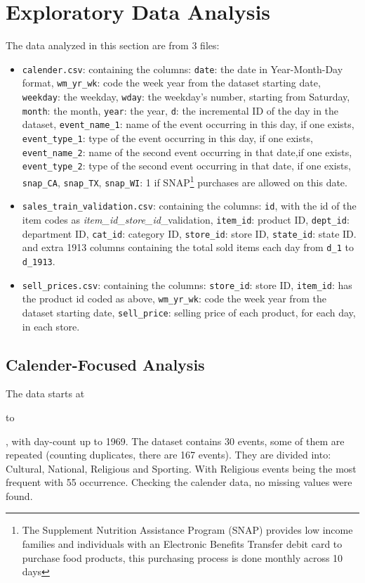 \documentclass[12pt]{article}
\begin{document}
\section{Exploratory Data Analysis}
The data analyzed in this section are from 3 files: \begin{itemize}
    \item \texttt{calender.csv}: containing the columns: \texttt{date}: the date in Year-Month-Day format, \texttt{wm\_yr\_wk}: code the week year from the dataset starting date, \texttt{weekday}: the weekday, \texttt{wday}: the weekday's number, starting from Saturday, \texttt{month}: the month, \texttt{year}: the year, \texttt{d}: the incremental ID of the day in the dataset, \texttt{event\_name\_1}: name of the event occurring in this day, if one exists, \texttt{event\_type\_1}: type of the event occurring in this day, if one exists, \texttt{event\_name\_2}: name of the second event occurring in that date,if one exists, \texttt{event\_type\_2}: type of the second event occurring in that date, if one exists, \texttt{snap\_CA}, \texttt{snap\_TX}, \texttt{snap\_WI}: 1 if SNAP\footnote{The Supplement Nutrition 
    Assistance Program (SNAP) provides low income families and individuals with an Electronic Benefits Transfer 
    debit card to purchase food products, this purchasing process is done monthly across 10 days} purchases are allowed on this date.
    \item \texttt{sales\_train\_validation.csv}: containing the columns: \texttt{id}, with the id of the item codes as \textit{item\_id}\_\textit{store\_id}\_validation, \texttt{item\_id}: product ID, \texttt{dept\_id}: department ID,
    \texttt{cat\_id}: category ID, \texttt{store\_id}: store ID, \texttt{state\_id}: state ID. and extra 1913 columns containing the total sold items each day from \texttt{d\_1} to \texttt{d\_1913}.
    \item \texttt{sell\_prices.csv}: containing the columns: \texttt{store\_id}: store ID, \texttt{item\_id}: has the product id coded as above, \texttt{wm\_yr\_wk}: code the week year from the dataset starting date, \texttt{sell\_price}: selling price of each product, for each day, in each store.
    
\end{itemize}
\subsection{Calender-Focused Analysis}
The data starts at \date{January 29, 2011} to \date{June 19, 2016}, with day-count up to 1969. The dataset contains 30 events, some of them are repeated (counting duplicates, there are 167 events). They are divided into: Cultural, National, Religious and Sporting. With Religious events being the most frequent with 55 occurrence. Checking the calender data, no missing values were found.
\end{document}
